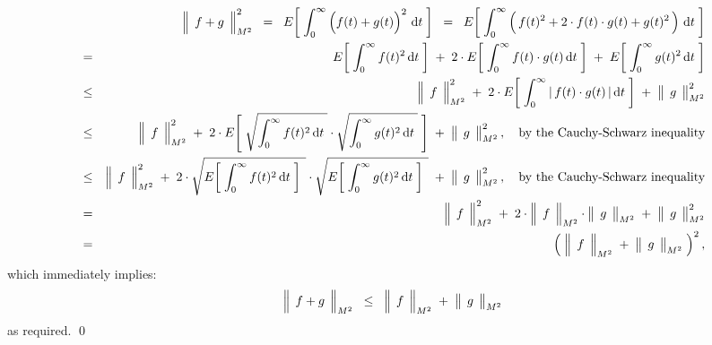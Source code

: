 \begin{eqnarray*}
&&
	\left\Vert\;\, \overset{{\color{white}.}}{f} + \overset{{\color{white}.}}{g} \,\;\right\Vert_{M^{2}}^{2}
\;\; = \;\;
	E\!\left[\; \int_{0}^{\infty} \left(f(t) \overset{{\color{white}.}}{+} g(t)\right)^{2} \,\d t \;\right]
\;\; = \;\;
	E\!\left[\; \int_{0}^{\infty}
		\left(\,f(t)^{2}
		\overset{{\color{white}.}}{+}
		2 \cdot f(t) \cdot g(t)
		\overset{{\color{white}.}}{+}
		g(t)^{2}\,\right)
		\,\d t \;\right]
\\
& = &
	E\!\left[\; \int_{0}^{\infty} f(t)^{2} \,\d t \;\right]
	\; + \;
	2 \cdot
	E\!\left[\; \int_{0}^{\infty}
		f(t) \cdot g(t)
		\,\d t \;\right]
	\; + \;
	E\!\left[\; \int_{0}^{\infty} g(t)^{2} \,\d t \;\right]
\\
& \leq &
	\left\Vert\;\, \overset{{\color{white}.}}{f} \,\;\right\Vert_{M^{2}}^{2}
	\; + \;
	2 \cdot
	E\!\left[\; \int_{0}^{\infty}
		\vert\,f(t) \cdot g(t)\,\vert
		\,\d t \;\right]
	\; + \;
	\left\Vert\;\, \overset{{\color{white}.}}{g} \,\;\right\Vert_{M^{2}}^{2}
\\
& \leq &
	\left\Vert\;\, \overset{{\color{white}.}}{f} \,\;\right\Vert_{M^{2}}^{2}
	\; + \;
	2 \cdot
	E\!\left[\;
		\sqrt{\int_{0}^{\infty} f(t)^{2} \,\d t{\color{white}.}}
		\cdot
		\sqrt{\int_{0}^{\infty} g(t)^{2} \,\d t{\color{white}.}}
		\;\right]
	\; + \;
	\left\Vert\;\, \overset{{\color{white}.}}{g} \,\;\right\Vert_{M^{2}}^{2},
	\quad
	\textnormal{by the Cauchy-Schwarz inequality}
\\
& \leq &
	\left\Vert\;\, \overset{{\color{white}.}}{f} \,\;\right\Vert_{M^{2}}^{2}
	\; + \;
	2 \cdot
	\sqrt{E\!\left[\;
		\int_{0}^{\infty} f(t)^{2} \,\d t
		\;\right]{\color{white}.}}
	\cdot
	\sqrt{E\!\left[\;
		\int_{0}^{\infty} g(t)^{2} \,\d t
		\;\right]{\color{white}.}}
	\; + \;
	\left\Vert\;\, \overset{{\color{white}.}}{g} \,\;\right\Vert_{M^{2}}^{2},
	\quad
	\textnormal{by the Cauchy-Schwarz inequality}
\\
& = &
	\left\Vert\;\, \overset{{\color{white}.}}{f} \,\;\right\Vert_{M^{2}}^{2}
	\; + \;
	2 \cdot
		\left\Vert\;\, \overset{{\color{white}.}}{f} \,\;\right\Vert_{M^{2}}
		\cdot
		\left\Vert\;\, \overset{{\color{white}.}}{g} \,\;\right\Vert_{M^{2}}
	\; + \;
	\left\Vert\;\, \overset{{\color{white}.}}{g} \,\;\right\Vert_{M^{2}}^{2}
\\
& = &
	\left(\;
		\left\Vert\;\, \overset{{\color{white}.}}{f} \,\;\right\Vert_{M^{2}}
		\; + \;
		\left\Vert\;\, \overset{{\color{white}.}}{g} \,\;\right\Vert_{M^{2}}
		\;\right)^{2},
\end{eqnarray*}
which immediately implies:
\begin{equation*}
\left\Vert\;\, \overset{{\color{white}.}}{f} + \overset{{\color{white}.}}{g} \,\;\right\Vert_{M^{2}}
\;\; \leq \;\;
	\left\Vert\;\, \overset{{\color{white}.}}{f} \,\;\right\Vert_{M^{2}}
	\; + \;
	\left\Vert\;\, \overset{{\color{white}.}}{g} \,\;\right\Vert_{M^{2}}
\end{equation*}
as required.
\qed

